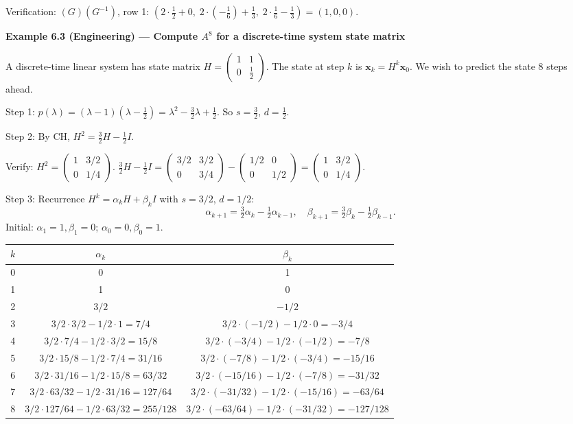 \documentclass[12pt,a4paper]{article}
\begin{document}
Verification: $(G)(G^{-1})$, row 1: $(2\cdot\tfrac{1}{2}+0,\; 2\cdot(-\tfrac{1}{6})+\tfrac{1}{3},\; 2\cdot\tfrac{1}{6}-\tfrac{1}{3})=(1,0,0)$. \checkmark

\bigskip

\textbf{Example 6.3 (Engineering) --- Compute $A^{8}$ for a discrete-time system state matrix}

A discrete-time linear system has state matrix $H = \begin{pmatrix} 1 & 1 \\ 0 & \frac{1}{2} \end{pmatrix}$.
The state at step $k$ is $\mathbf{x}_{k} = H^{k}\mathbf{x}_{0}$.
We wish to predict the state 8 steps ahead.

Step 1: $p(\lambda) = (\lambda-1)(\lambda-\tfrac{1}{2}) = \lambda^{2} - \tfrac{3}{2}\lambda + \tfrac{1}{2}$.
So $s = \tfrac{3}{2}$, $d = \tfrac{1}{2}$.

Step 2: By CH, $H^{2} = \tfrac{3}{2}H - \tfrac{1}{2}I$.

Verify: $H^{2}=\begin{pmatrix}1&3/2\\0&1/4\end{pmatrix}$.
$\tfrac{3}{2}H-\tfrac{1}{2}I=\begin{pmatrix}3/2&3/2\\0&3/4\end{pmatrix}-\begin{pmatrix}1/2&0\\0&1/2\end{pmatrix}=\begin{pmatrix}1&3/2\\0&1/4\end{pmatrix}$. \checkmark

Step 3: Recurrence $H^{k} = \alpha_k H + \beta_k I$ with $s=3/2$, $d=1/2$:
\[
  \alpha_{k+1} = \tfrac{3}{2}\alpha_k - \tfrac{1}{2}\alpha_{k-1},\quad
  \beta_{k+1}  = \tfrac{3}{2}\beta_k  - \tfrac{1}{2}\beta_{k-1}.
\]
Initial: $\alpha_1=1,\beta_1=0$; $\alpha_0=0,\beta_0=1$.

\begin{center}
\begin{tabular}{@{}ccc@{}}
\toprule
$k$ & $\alpha_k$ & $\beta_k$ \\
\midrule
0 & 0 & 1 \\
1 & 1 & 0 \\
2 & $3/2$ & $-1/2$ \\
3 & $3/2\cdot3/2-1/2\cdot1=7/4$ & $3/2\cdot(-1/2)-1/2\cdot0=-3/4$ \\
4 & $3/2\cdot7/4-1/2\cdot3/2=15/8$ & $3/2\cdot(-3/4)-1/2\cdot(-1/2)=-7/8$ \\
5 & $3/2\cdot15/8-1/2\cdot7/4=31/16$ & $3/2\cdot(-7/8)-1/2\cdot(-3/4)=-15/16$ \\
6 & $3/2\cdot31/16-1/2\cdot15/8=63/32$ & $3/2\cdot(-15/16)-1/2\cdot(-7/8)=-31/32$ \\
7 & $3/2\cdot63/32-1/2\cdot31/16=127/64$ & $3/2\cdot(-31/32)-1/2\cdot(-15/16)=-63/64$ \\
8 & $3/2\cdot127/64-1/2\cdot63/32=255/128$ & $3/2\cdot(-63/64)-1/2\cdot(-31/32)=-127/128$ \\
\bottomrule
\end{tabular}
\end{center}
\end{document}
